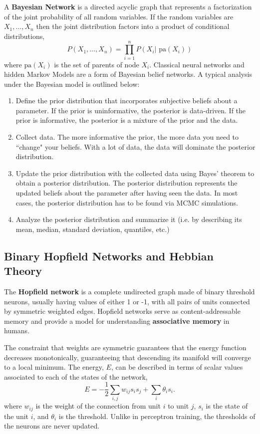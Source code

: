 \documentclass{article}
\begin{document}
A \textbf{Bayesian Network} is a directed acyclic graph that represents a factorization of the joint probability of all random variables.  If the random variables are $X_{1},\ldots ,X_{n}$ then the joint distribution factors into a product of conditional distributions, 
\[
    P(X_{1},\ldots ,X_{n}) = \prod_{i=1}^{n}P(X_{i} | {\text{ pa}}(X_{i}))
\]
where ${\text{pa}}(X_{i})$ is the set of parents of node $X_{i}$. Classical neural networks and hidden Markov Models are a form of Bayesian belief networks. A typical analysis under the Bayesian model is outlined below:


\begin{enumerate}
    \item Define the prior distribution that incorporates subjective beliefs about a parameter. If the prior is uninformative, the posterior is data-driven. If the prior is informative, the posterior is a mixture of the prior and the data.
    
    \item Collect data. The more informative the prior, the more data you need to ``change" your beliefs. With a lot of data, the data will dominate the posterior distribution.
    
    \item Update the prior distribution with the collected data using Bayes' theorem to obtain a posterior distribution. The posterior distribution represents the updated beliefs about the parameter after having seen the data. In most cases, the posterior distribution has to be found via MCMC simulations.
    
    \item Analyze the posterior distribution and summarize it (i.e. by describing its mean, median, standard deviation, quantiles, etc.)
\end{enumerate}

\subsection{Binary Hopfield Networks and Hebbian Theory}

The \textbf{Hopfield network} is a complete undirected graph made of binary threshold neurons, usually having values of either 1 or -1, with all pairs of units connected by symmetric weighted edges. Hopfield networks serve as content-addressable memory and provide a model for understanding \textbf{associative memory} in humans.

The constraint that weights are symmetric guarantees that the energy function decreases monotonically, guaranteeing that descending its manifold will converge to a local minimum. The energy, $E$, can be described in terms of scalar values associated to each of the states of the network,
\[
    E = -\frac{1}{2} \sum_{i,j} w_{ij} s_i s_j + \sum_i \theta_i s_i.
\]
where $w_{ij}$ is the weight of the connection from unit $i$ to unit $j$, $s_{i}$ is the state of the unit $i$, and $\theta_{i}$ is the threshold. Unlike in perceptron training, the thresholds of the neurons are never updated.
\end{document}
